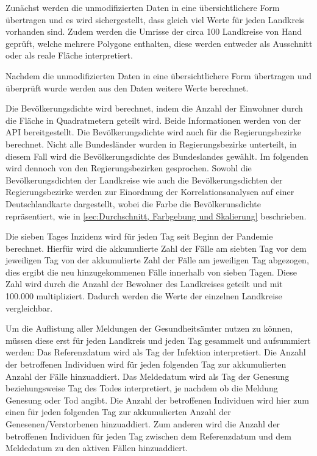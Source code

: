 Zunächst werden die unmodifizierten Daten in eine übersichtlichere Form übertragen und es wird sichergestellt, dass gleich viel Werte für jeden Landkreis vorhanden sind. Zudem werden die Umrisse der circa 100 Landkreise von Hand geprüft, welche mehrere Polygone enthalten, diese werden entweder als Ausschnitt oder als reale Fläche interpretiert.

Nachdem die unmodifizierten Daten in eine übersichtlichere Form übertragen und überprüft wurde werden aus den Daten weitere Werte berechnet.

Die Bevölkerungsdichte wird berechnet, indem die Anzahl der Einwohner durch die Fläche in Quadratmetern geteilt wird. Beide Informationen werden von der API bereitgestellt.
Die Bevölkerungsdichte wird auch für die Regierungsbezirke berechnet. Nicht alle Bundesländer wurden in Regierungsbezirke unterteilt, in diesem Fall wird die Bevölkerungsdichte des Bundeslandes gewählt. Im folgenden wird dennoch von \glqq{}den Regierungsbezirken\grqq{} gesprochen. 
Sowohl die Bevölkerungsdichten der Landkreise wie auch die Bevölkerungsdichten der Regierungsbezirke werden zur Einordnung der Korrelationsanalysen auf einer Deutschlandkarte dargestellt, wobei die Farbe die Bevölkerunsdichte repräsentiert, wie in \autoref{sec:Durchschnitt, Farbgebung und Skalierung} beschrieben.

Die sieben Tages Inzidenz wird für jeden Tag seit Beginn der Pandemie berechnet. Hierfür wird die akkumulierte Zahl der Fälle am siebten Tag vor dem jeweiligen Tag von der akkumulierte Zahl der Fälle am jeweiligen Tag abgezogen, dies ergibt die neu hinzugekommenen Fälle innerhalb von sieben Tagen.
Diese Zahl wird durch die Anzahl der Bewohner des Landkreises geteilt und mit 100.000 multipliziert. Dadurch werden die Werte der einzelnen Landkreise vergleichbar.


Um die Auflistung aller Meldungen der Gesundheitsämter nutzen zu können, müssen diese erst für jeden Landkreis und jeden Tag gesammelt und aufsummiert werden:
Das Referenzdatum wird als Tag der Infektion interpretiert. Die Anzahl der betroffenen Individuen wird für jeden folgenden Tag zur akkumulierten Anzahl der Fälle hinzuaddiert.
Das Meldedatum wird als Tag der Genesung beziehungsweise Tag des Todes interpretiert, je nachdem ob die Meldung Genesung oder Tod angibt. Die Anzahl der betroffenen Individuen wird hier zum einen für jeden folgenden Tag zur akkumulierten Anzahl der Genesenen/Verstorbenen hinzuaddiert. Zum anderen wird die Anzahl der betroffenen Individuen für jeden Tag zwischen dem Referenzdatum und dem Meldedatum zu den aktiven Fällen hinzuaddiert.

